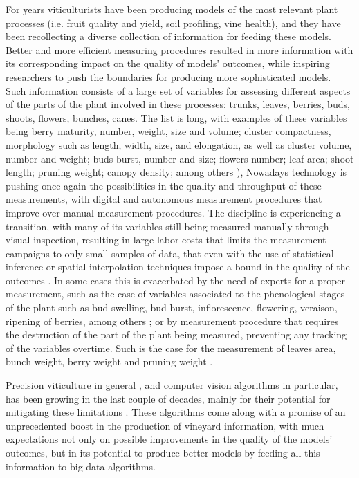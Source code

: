 \documentclass[a4paper,authoryear,review]{elsarticle}
\begin{document}
	For years viticulturists have been producing models of the most relevant plant processes (i.e. fruit quality and yield, soil profiling, vine health), and they have been recollecting a diverse collection of information for feeding these models. Better and more efficient measuring procedures resulted in more information with its corresponding impact on the quality of models’ outcomes, while inspiring researchers to push the boundaries for producing more sophisticated models. Such information consists of a large set of variables for assessing different aspects of the parts of the plant involved in these processes: trunks, leaves, berries, buds, shoots, flowers, bunches, canes. The list is long, with examples of these variables being berry maturity, number, weight, size and volume; cluster compactness, morphology such as length, width, size, and elongation, as well as cluster volume, number and weight; buds burst, number and size; flowers number; leaf area; shoot length; pruning weight; canopy density; among others \citep{awriNDmanual1, awriNDmanual3}),
	Nowadays technology is pushing once again the possibilities in the quality and throughput of these measurements, with digital and autonomous measurement procedures that improve over manual measurement procedures. The discipline is experiencing a transition, with many of its variables still being measured manually through visual inspection, resulting in large labor costs that limits the measurement campaigns to only small samples of data, that even with the use of statistical inference or spatial interpolation techniques impose a bound in the quality of the outcomes \citep{whelan1996spatial}. 
	In some cases this is exacerbated by the need of experts for a proper measurement, such as the case of variables associated to the phenological stages of the plant such as bud swelling, bud burst, inflorescence, flowering, veraison, ripening of berries, among others \citep{lorenz1995growth}; or by measurement procedure that requires the destruction of the part of the plant being measured, preventing any tracking of the variables overtime. Such is the case for the measurement of leaves area, bunch weight, berry weight and pruning weight \citep{kliewer2005leaf}. 
	
	Precision viticulture in general \citep{bramley2009lessons}, and computer vision algorithms in particular, has been growing in the last couple of decades, mainly for their potential for mitigating these limitations \citep{seng2018computer, matese2015technology}. These algorithms come along with a promise of an unprecedented boost in the production of vineyard information, with much expectations not only on possible improvements in the quality of the models’ outcomes, but in its potential to produce better models by feeding all this information to big data algorithms. 
	
\end{document}

